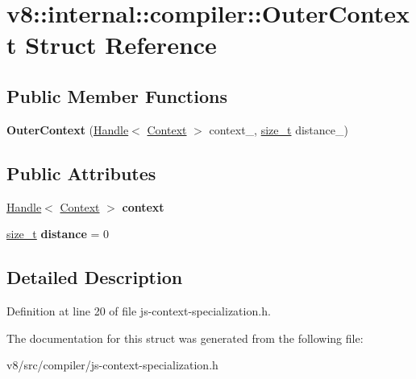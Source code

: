 \hypertarget{structv8_1_1internal_1_1compiler_1_1OuterContext}{}\section{v8\+:\+:internal\+:\+:compiler\+:\+:Outer\+Context Struct Reference}
\label{structv8_1_1internal_1_1compiler_1_1OuterContext}
\subsection*{Public Member Functions}
\begin{DoxyCompactItemize}
\item 
\mbox{\label{structv8_1_1internal_1_1compiler_1_1OuterContext_afb859fdee09a71e187a77bfc0c62291e}} 
{\bfseries Outer\+Context} (\mbox{\hyperlink{classv8_1_1internal_1_1Handle}{Handle}}$<$ \mbox{\hyperlink{classv8_1_1internal_1_1Context}{Context}} $>$ context\+\_\+, \mbox{\hyperlink{classsize__t}{size\+\_\+t}} distance\+\_\+)
\end{DoxyCompactItemize}
\subsection*{Public Attributes}
\begin{DoxyCompactItemize}
\item 
\mbox{\label{structv8_1_1internal_1_1compiler_1_1OuterContext_a2dc0200b5c8f8e7ee0ac875fe49d423a}} 
\mbox{\hyperlink{classv8_1_1internal_1_1Handle}{Handle}}$<$ \mbox{\hyperlink{classv8_1_1internal_1_1Context}{Context}} $>$ {\bfseries context}
\item 
\mbox{\label{structv8_1_1internal_1_1compiler_1_1OuterContext_a48c283122c12f72b8b56aadab05768cf}} 
\mbox{\hyperlink{classsize__t}{size\+\_\+t}} {\bfseries distance} = 0
\end{DoxyCompactItemize}


\subsection{Detailed Description}


Definition at line 20 of file js-\/context-\/specialization.\+h.



The documentation for this struct was generated from the following file\+:\begin{DoxyCompactItemize}
\item 
v8/src/compiler/js-\/context-\/specialization.\+h\end{DoxyCompactItemize}
